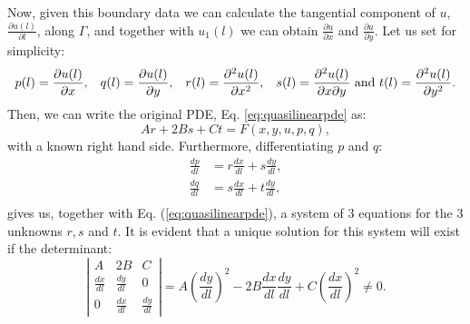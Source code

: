 Now, given this boundary data we can calculate the tangential component of $u$, $\frac{\partial u(l)}{\partial l}$, along $\Gamma$, and together with $u_1(l)$ we can obtain $\frac{\partial u}{\partial x}$ and $\frac{\partial u}{\partial y}$. Let us set for simplicity:
\begin{equation}
  \label{eq:derivativesymbols}
  p(l) = \frac{\partial u(l)}{\partial x}, \hspace{0.3cm} q(l) =  \frac{\partial u(l)}{\partial y},  \hspace{0.3cm} r(l) =  \frac{\partial^2 u(l)}{\partial x^2},  \hspace{0.3cm} s(l) =  \frac{\partial^2 u(l)}{\partial x \partial y} \text{ and } t(l) =  \frac{\partial^2 u(l)}{\partial y^2}.
\end{equation}
Then, we can write the original PDE, Eq. \ref{eq:quasilinearpde} as:
\begin{equation}
  \label{eq:quasilinearpde_parametric}
   A r +2B s +  C t = F(x,y,u,p,q), 
\end{equation} 
with a known right hand side. Furthermore, differentiating $p$ and $q$:
\begin{align*}
  \frac{d p}{d l} &= r\frac{d x}{d l} + s\frac{d y}{d l}, \\  
  \frac{d q}{d l} &= s\frac{d x}{d l} + t\frac{d y}{d l}, \\  
\end{align*}
gives us, together with Eq. (\ref{eq:quasilinearpde}), a system of 3 equations for the 3 unknowns $r,s$ and $t$. It is evident that a unique solution for this system will exist if the determinant:
\begin{equation}
  \label{eq:characteristicsdet}
  \left| \begin{array}{ccc} A & 2B & C\\ \frac{dx}{dl} &  \frac{dy}{dl} & 0 \\  0 & \frac{dx}{dl} &  \frac{dy}{dl} \end{array} \right | = A (\frac{dy}{dl})^2 -2B \frac{dx}{dl}\frac{dy}{dl} +C(\frac{dx}{dl})^2 \neq 0. 
\end{equation}

